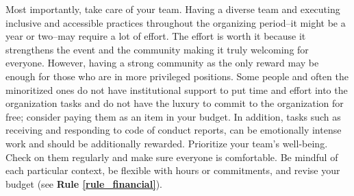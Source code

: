 \documentclass[10pt,letterpaper]{article}
\begin{document}
Most importantly, take care of your team. 
Having a diverse team and executing inclusive and accessible practices throughout the organizing period--it might be a year or two--may require a lot of effort. 
The effort is worth it because it strengthens the event and the community making it truly welcoming for everyone. 
However, having a strong community as the only reward may be enough for those who are in more privileged positions. 
Some people and often the minoritized ones do not have institutional support to put time and effort into the organization tasks and do not have the luxury to commit to the organization for free; consider paying them as an item in your budget.  
In addition, tasks such as receiving and responding to code of conduct reports, can be emotionally intense work and should be additionally rewarded.
Prioritize your team's well-being. Check on them regularly and make sure everyone is comfortable. 
Be mindful of each particular context, be flexible with hours or commitments, and revise your budget (see \textbf{Rule \ref{rule_financial}}). 


\end{document}
